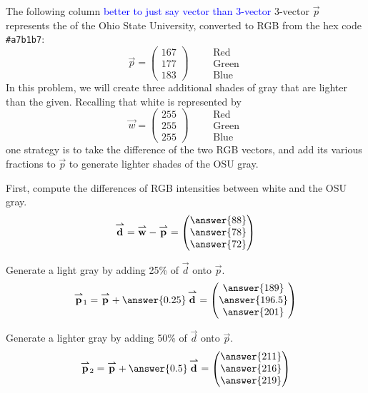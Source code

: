 \documentclass{ximera}
\author{Tae Eun Kim}
\begin{document}
\begin{exercise}
  The following column \textcolor{blue}{better to just say vector than 3-vector} 3-vector $\vec{p}$ represents the  of the Ohio State
  University, converted to RGB from the hex code \verb|#a7b1b7|:
  \[
    \vec{p} = \begin{pmatrix}
      167\\ 177\\ 183
    \end{pmatrix}
    \qquad
    \begin{array}{l}
      \text{Red}\\
      \text{Green}\\
      \text{Blue}
    \end{array}
  \]
  In this problem, we will create three additional shades of gray that are
  lighter than the given. Recalling that white is represented by
  \[
    \vec{w} = \begin{pmatrix}
      255\\ 255\\ 255
    \end{pmatrix}
    \qquad
    \begin{array}{l}
      \text{Red}\\
      \text{Green}\\
      \text{Blue}
    \end{array}
  \]
  one strategy is to take the difference of the two RGB vectors, and
  add its various fractions to $\vec{p}$ to generate lighter shades of
  the OSU gray.

  First, compute the differences of RGB intensities between white and the OSU
  gray.
  \[
    \vec{d} = \vec{w} - \vec{p} =
    \begin{pmatrix}
      \answer{88}\\
      \answer{78}\\
      \answer{72}
    \end{pmatrix}
  \]

  Generate a light gray by adding 25\% of $\vec{d}$ onto $\vec{p}$.
  \[
    \vec{p}_1 = \vec{p} + \answer{0.25}\,\vec{d} =
    \begin{pmatrix}
      \answer{189}\\
      \answer{196.5}\\
      \answer{201}
    \end{pmatrix}
  \]

  Generate a lighter gray by adding 50\% of $\vec{d}$ onto $\vec{p}$.
  \[
    \vec{p}_2 = \vec{p} + \answer{0.5}\,\vec{d} =
    \begin{pmatrix}
      \answer{211}\\
      \answer{216}\\
      \answer{219}
    \end{pmatrix}
  \]


\end{exercise}
\end{document}

